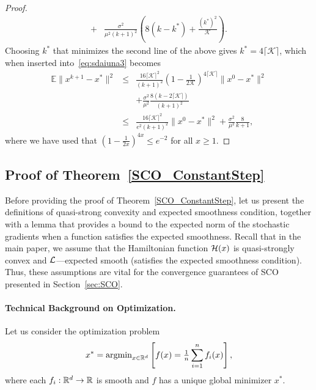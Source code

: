 \documentclass{article}
\begin{document}
\begin{proof}
\begin{eqnarray}
  +&\frac{\sigma^2 }{\mu^2 (k+1)^2}\left(8 (k-k^*) +   \frac{(k^*)^2}{\mathcal{K} } \right).  \label{eq:sdaiuna3}
\end{eqnarray}
Choosing $k^*$ that minimizes the second line of the above gives $k^* = 4\lceil\mathcal{K} \rceil$, which when inserted into~\eqref{eq:sdaiuna3} becomes
\begin{eqnarray}
 \mathbb{E}\| x^{k+1}-x^*\|^2 &\leq &
  \frac{16 \lceil\mathcal{K} \rceil^2}{(k+1)^2 } \left( 1 -  \frac{1}{2\mathcal{K}} \right)^{ 4\lceil\mathcal{K} \rceil} \|x^{0}-x^*\|^2  \nonumber \\
 & & +\frac{\sigma^2 }{\mu^2 }\frac{8 (k-2\lceil\mathcal{K} \rceil)}{(k+1)^2} \nonumber \\
  & \leq &  \frac{16 \lceil\mathcal{K} \rceil^2}{e^2(k+1)^2 }  \|x^{0}-x^*\|^2  +  \frac{\sigma^2 }{\mu^2 }\frac{8 }{k+1}, \label{eq:sdaiuna32}
\end{eqnarray}
where we have used that $\left( 1 -  \frac{1}{2x} \right)^{ 4x} \leq e^{-2}$  for all $x \geq 1.$
\end{proof}

\subsection{Proof of Theorem~\ref{SCO_ConstantStep}}
\label{ProofSCO_ConstantStep}
Before providing the proof of Theorem~\ref{SCO_ConstantStep}, let us present the definitions of quasi-strong convexity and expected smoothness condition, together with a lemma that provides a bound to the expected norm of the
stochastic gradients when a function satisfies the expected smoothness. Recall that in the main paper, we assume that 
the Hamiltonian function ${\cal H}(x)$ is quasi-strongly convex and ${\cal L}$---expected smooth (satisfies the expected smoothness condition). Thus, these assumptions are vital for the convergence guarantees of SCO presented in Section~\ref{sec:SCO}.

\paragraph{Technical Background on Optimization.}
Let us consider the optimization problem
\begin{equation}
\label{eq:probOPT}
 x^* = \text{argmin}_{x\in\mathbb{R}^d} \left[ f(x) = \tfrac{1}{n} \sum_{i=1}^n f_i(x) \right], 
\end{equation}
where each $f_i: \mathbb{R}^d \to \mathbb{R}$ is smooth and $f$ has a unique global minimizer $x^*$.
\end{document}
